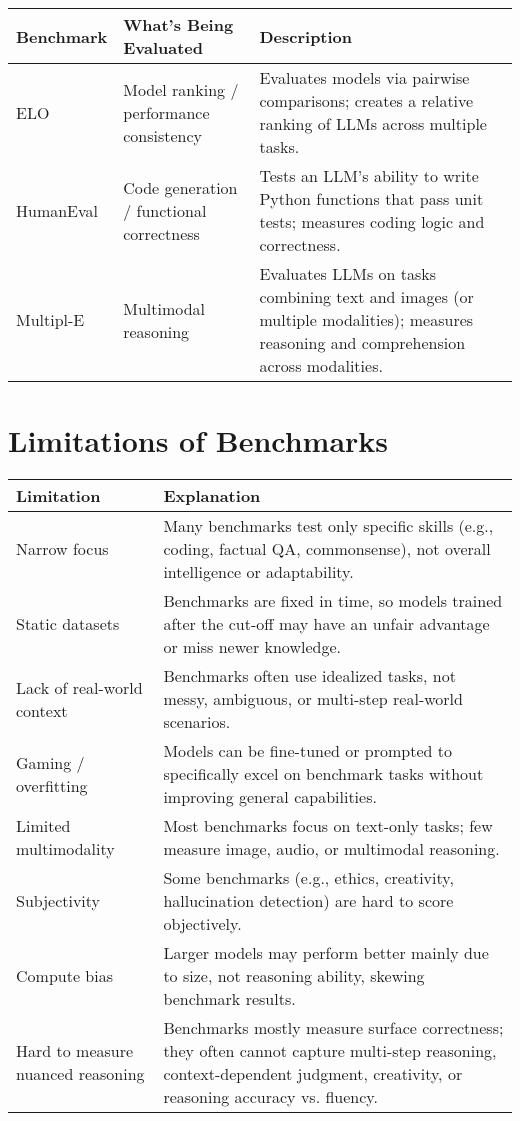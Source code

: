 \begin{tabularx}{\textwidth}{|>{\hsize=0.2\hsize}X|>{\hsize=0.3\hsize}X|>{\hsize=0.5\hsize}X|}
\hline
\textbf{Benchmark} & \textbf{What’s Being Evaluated} & \textbf{Description} \\
\hline
ELO & Model ranking / performance consistency & Evaluates models via pairwise comparisons; creates a relative ranking of LLMs across multiple tasks. \\
\hline
HumanEval & Code generation / functional correctness & Tests an LLM’s ability to write Python functions that pass unit tests; measures coding logic and correctness. \\
\hline
Multipl-E & Multimodal reasoning & Evaluates LLMs on tasks combining text and images (or multiple modalities); measures reasoning and comprehension across modalities. \\
\hline
\end{tabularx}

\vspace{1em}

\section{Limitations of Benchmarks}

\begin{tabularx}{\textwidth}{|>{\hsize}L|>{\hsize}L|}
\hline
\textbf{Limitation} & \textbf{Explanation} \\
\hline
Narrow focus & Many benchmarks test only specific skills (e.g., coding, factual QA, commonsense), not overall intelligence or adaptability. \\
\hline
Static datasets & Benchmarks are fixed in time, so models trained after the cut-off may have an unfair advantage or miss newer knowledge. \\
\hline
Lack of real-world context & Benchmarks often use idealized tasks, not messy, ambiguous, or multi-step real-world scenarios. \\
\hline
Gaming / overfitting & Models can be fine-tuned or prompted to specifically excel on benchmark tasks without improving general capabilities. \\
\hline
Limited multimodality & Most benchmarks focus on text-only tasks; few measure image, audio, or multimodal reasoning. \\
\hline
Subjectivity & Some benchmarks (e.g., ethics, creativity, hallucination detection) are hard to score objectively. \\
\hline
Compute bias & Larger models may perform better mainly due to size, not reasoning ability, skewing benchmark results. \\
\hline
Hard to measure nuanced reasoning & Benchmarks mostly measure surface correctness; they often cannot capture multi-step reasoning, context-dependent judgment, creativity, or reasoning accuracy vs. fluency. \\
\hline
\end{tabularx}

